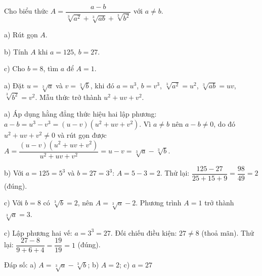 \begin{problem}[9DS-CAN-049]
Cho biểu thức $A = \dfrac{a - b}{\sqrt[3]{a^2} + \sqrt[3]{ab} + \sqrt[3]{b^2}}$ với $a \neq b$.

a) Rút gọn $A$.

b) Tính $A$ khi $a = 125$, $b = 27$.

c) Cho $b = 8$, tìm $a$ để $A = 1$.

\begin{solution}
a) Đặt $u = \sqrt[3]{a}$ và $v = \sqrt[3]{b}$, khi đó $a = u^3$, $b = v^3$, $\sqrt[3]{a^2} = u^2$, $\sqrt[3]{ab} = uv$, $\sqrt[3]{b^2} = v^2$. Mẫu thức trở thành $u^2 + uv + v^2$.

a) Áp dụng hằng đẳng thức hiệu hai lập phương: $a - b = u^3 - v^3 = (u - v)(u^2 + uv + v^2)$. Vì $a \neq b$ nên $a - b \neq 0$, do đó $u^2 + uv + v^2 \neq 0$ và rút gọn được $A = \dfrac{(u - v)(u^2 + uv + v^2)}{u^2 + uv + v^2} = u - v = \sqrt[3]{a} - \sqrt[3]{b}$.

b) Với $a = 125 = 5^3$ và $b = 27 = 3^3$: $A = 5 - 3 = 2$. Thử lại: $\dfrac{125 - 27}{25 + 15 + 9} = \dfrac{98}{49} = 2$ (đúng).

c) Với $b = 8$ có $\sqrt[3]{b} = 2$, nên $A = \sqrt[3]{a} - 2$. Phương trình $A = 1$ trở thành $\sqrt[3]{a} = 3$.

c) Lập phương hai vế: $a = 3^3 = 27$. Đối chiếu điều kiện: $27 \neq 8$ (thoả mãn). Thử lại: $\dfrac{27 - 8}{9 + 6 + 4} = \dfrac{19}{19} = 1$ (đúng).

Đáp số: a) $\boxed{A = \sqrt[3]{a} - \sqrt[3]{b}}$; b) $\boxed{A = 2}$; c) $\boxed{a = 27}$
\end{solution}
\end{problem}

